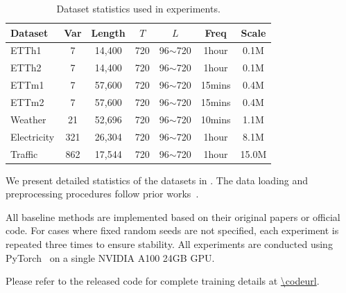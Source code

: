 \begin{table}[ht]
\centering
\small
\setlength{\tabcolsep}{4pt}
\begin{tabular}{lcccccc}
\hline
Dataset     & Var & Length & $T$ & $L$       & Freq   & Scale  \\
\hline
ETTh1       & 7   & 14,400 & 720 & 96$\sim$720 & 1hour   & 0.1M   \\
ETTh2       & 7   & 14,400 & 720 & 96$\sim$720 & 1hour   & 0.1M   \\
ETTm1       & 7   & 57,600 & 720 & 96$\sim$720 & 15mins  & 0.4M   \\
ETTm2       & 7   & 57,600 & 720 & 96$\sim$720 & 15mins  & 0.4M   \\
Weather     & 21  & 52,696 & 720 & 96$\sim$720 & 10mins  & 1.1M   \\
Electricity & 321 & 26,304 & 720 & 96$\sim$720 & 1hour   & 8.1M   \\
Traffic     & 862 & 17,544 & 720 & 96$\sim$720 & 1hour   & 15.0M  \\
\hline
\end{tabular}
\caption{Dataset statistics used in experiments.}
\label{tab:dataset_details}
\end{table}

We present detailed statistics of the datasets in . 
The data loading and preprocessing procedures follow prior works~\citep{nie2023patchtst, huang2025timebase}.

All baseline methods are implemented based on their original papers or official code.
For cases where fixed random seeds are not specified, each experiment is repeated three times to ensure stability. All experiments are conducted using PyTorch~\citep{paszke2019pytorch} on a single NVIDIA A100 24GB GPU.

Please refer to the released code for complete training details at \url{\codeurl}. 

